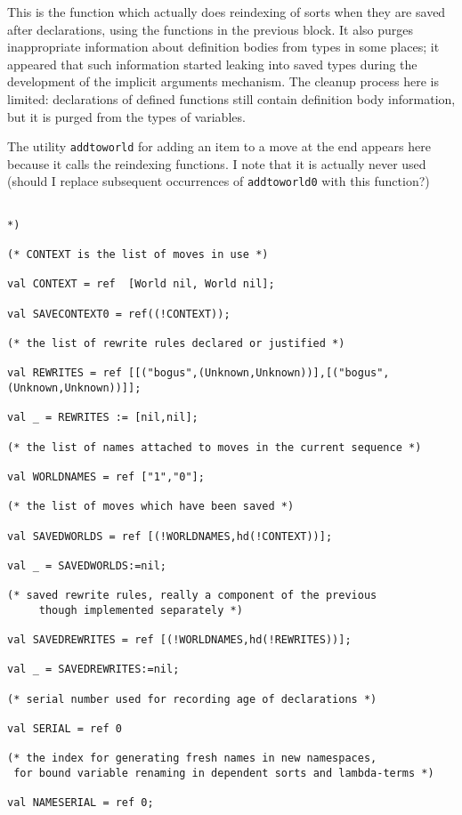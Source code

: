 \documentclass{article}
\begin{document}
This is the function which actually does reindexing of sorts when they are saved after declarations, using the functions in the previous block.  It also purges inappropriate
information about definition bodies from types in some places;  it appeared that such information started leaking into saved types
during the development of the implicit arguments mechanism.  The cleanup process here is limited:  declarations of defined functions
still contain definition body information, but it is purged from the types of variables.

The utility {\tt addtoworld} for adding an item to a move at the end appears here because it calls the reindexing functions.  I note that it is actually never used (should I replace subsequent occurrences of {\tt addtoworld0} with this function?)

\begin{verbatim}

*)

(* CONTEXT is the list of moves in use *)

val CONTEXT = ref  [World nil, World nil];

val SAVECONTEXT0 = ref((!CONTEXT));

(* the list of rewrite rules declared or justified *)

val REWRITES = ref [[("bogus",(Unknown,Unknown))],[("bogus",(Unknown,Unknown))]];

val _ = REWRITES := [nil,nil];

(* the list of names attached to moves in the current sequence *)

val WORLDNAMES = ref ["1","0"];

(* the list of moves which have been saved *)

val SAVEDWORLDS = ref [(!WORLDNAMES,hd(!CONTEXT))];

val _ = SAVEDWORLDS:=nil;

(* saved rewrite rules, really a component of the previous 
     though implemented separately *)

val SAVEDREWRITES = ref [(!WORLDNAMES,hd(!REWRITES))];

val _ = SAVEDREWRITES:=nil;

(* serial number used for recording age of declarations *)

val SERIAL = ref 0

(* the index for generating fresh names in new namespaces,
 for bound variable renaming in dependent sorts and lambda-terms *)

val NAMESERIAL = ref 0;


\end{verbatim}
\end{document}
